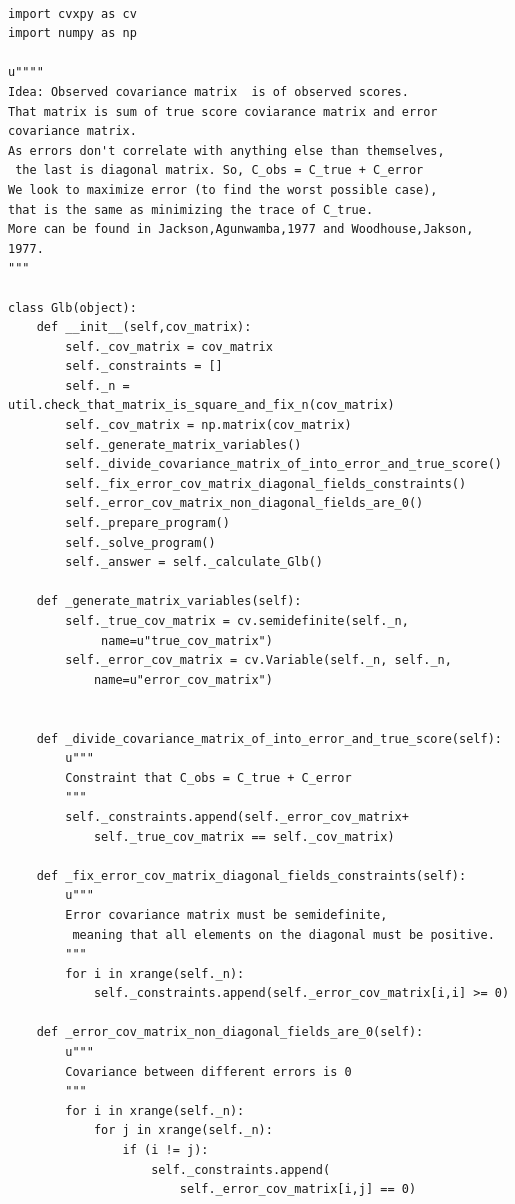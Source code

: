 \documentclass[a4paper,12pt,oneside]{article}
\newenvironment{customFloatWrap}{}{}
\numberwithin{equation}{section}
\theoremstyle{definition}
\begin{document}
\begin{subappendices}
\begin{customFloatWrap}
\begin{verbatim}

import cvxpy as cv
import numpy as np

u""""
Idea: Observed covariance matrix  is of observed scores. 
That matrix is sum of true score coviarance matrix and error covariance matrix.
As errors don't correlate with anything else than themselves,
 the last is diagonal matrix. So, C_obs = C_true + C_error
We look to maximize error (to find the worst possible case), 
that is the same as minimizing the trace of C_true.
More can be found in Jackson,Agunwamba,1977 and Woodhouse,Jakson, 1977.
"""

class Glb(object):
    def __init__(self,cov_matrix):
        self._cov_matrix = cov_matrix
        self._constraints = []
        self._n = util.check_that_matrix_is_square_and_fix_n(cov_matrix)
        self._cov_matrix = np.matrix(cov_matrix)
        self._generate_matrix_variables()
        self._divide_covariance_matrix_of_into_error_and_true_score()
        self._fix_error_cov_matrix_diagonal_fields_constraints()
        self._error_cov_matrix_non_diagonal_fields_are_0()
        self._prepare_program()
        self._solve_program()
        self._answer = self._calculate_Glb()

    def _generate_matrix_variables(self):
        self._true_cov_matrix = cv.semidefinite(self._n,
             name=u"true_cov_matrix")
        self._error_cov_matrix = cv.Variable(self._n, self._n, 
            name=u"error_cov_matrix") 
    
    
    def _divide_covariance_matrix_of_into_error_and_true_score(self):
        u"""
        Constraint that C_obs = C_true + C_error
        """
        self._constraints.append(self._error_cov_matrix+
            self._true_cov_matrix == self._cov_matrix)
        
    def _fix_error_cov_matrix_diagonal_fields_constraints(self):
        u"""
        Error covariance matrix must be semidefinite,
         meaning that all elements on the diagonal must be positive.
        """
        for i in xrange(self._n):
            self._constraints.append(self._error_cov_matrix[i,i] >= 0)

    def _error_cov_matrix_non_diagonal_fields_are_0(self):
        u"""
        Covariance between different errors is 0
        """
        for i in xrange(self._n):
            for j in xrange(self._n):
                if (i != j):
                    self._constraints.append(
                        self._error_cov_matrix[i,j] == 0) 


\end{verbatim}
\end{customFloatWrap}
\end{subappendices}
\end{document}
